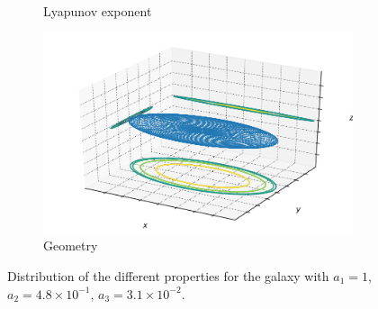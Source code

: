 \begin{figure}[h]
\begin{subfigure}[t]{0.4\textwidth}
        \caption{Lyapunov exponent}
    \end{subfigure}
    \begin{subfigure}[t]{0.4\textwidth}
        \includegraphics[width=\textwidth]{"../Files/Week 13/images/1_ellipsoid"}
        \caption{Geometry}
    \end{subfigure}
    \caption{Distribution of the different properties for the galaxy with $a_1 = 1$, $a_2 = 4.8\times10^{-1}$, $a_3 = 3.1\times10^{-2}$.}
\end{figure}


